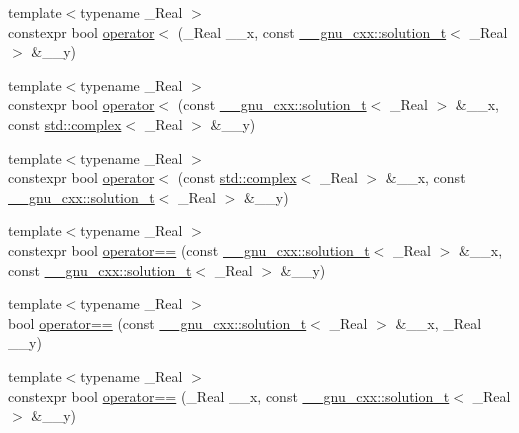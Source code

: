 \begin{DoxyCompactItemize}
\item 
{\footnotesize template$<$typename \+\_\+\+Real $>$ }\\constexpr bool \hyperlink{namespacestd_a183c95d9119b28c67d257989db658fdb}{operator$<$} (\+\_\+\+Real \+\_\+\+\_\+x, const \hyperlink{namespace____gnu__cxx_ae20ea642de50eb361074c62676b0159c}{\+\_\+\+\_\+gnu\+\_\+cxx\+::solution\+\_\+t}$<$ \+\_\+\+Real $>$ \&\+\_\+\+\_\+y)
\item 
{\footnotesize template$<$typename \+\_\+\+Real $>$ }\\constexpr bool \hyperlink{namespacestd_a4586465c3d71c8a977bb56c06c604eab}{operator$<$} (const \hyperlink{namespace____gnu__cxx_ae20ea642de50eb361074c62676b0159c}{\+\_\+\+\_\+gnu\+\_\+cxx\+::solution\+\_\+t}$<$ \+\_\+\+Real $>$ \&\+\_\+\+\_\+x, const \hyperlink{classstd_1_1complex}{std\+::complex}$<$ \+\_\+\+Real $>$ \&\+\_\+\+\_\+y)
\item 
{\footnotesize template$<$typename \+\_\+\+Real $>$ }\\constexpr bool \hyperlink{namespacestd_a907778dd7263e96c120e62cc0901dde9}{operator$<$} (const \hyperlink{classstd_1_1complex}{std\+::complex}$<$ \+\_\+\+Real $>$ \&\+\_\+\+\_\+x, const \hyperlink{namespace____gnu__cxx_ae20ea642de50eb361074c62676b0159c}{\+\_\+\+\_\+gnu\+\_\+cxx\+::solution\+\_\+t}$<$ \+\_\+\+Real $>$ \&\+\_\+\+\_\+y)
\item 
{\footnotesize template$<$typename \+\_\+\+Real $>$ }\\constexpr bool \hyperlink{namespacestd_aeae8446ca6e32925d681634d5db05780}{operator==} (const \hyperlink{namespace____gnu__cxx_ae20ea642de50eb361074c62676b0159c}{\+\_\+\+\_\+gnu\+\_\+cxx\+::solution\+\_\+t}$<$ \+\_\+\+Real $>$ \&\+\_\+\+\_\+x, const \hyperlink{namespace____gnu__cxx_ae20ea642de50eb361074c62676b0159c}{\+\_\+\+\_\+gnu\+\_\+cxx\+::solution\+\_\+t}$<$ \+\_\+\+Real $>$ \&\+\_\+\+\_\+y)
\item 
{\footnotesize template$<$typename \+\_\+\+Real $>$ }\\bool \hyperlink{namespacestd_a08af35ce00cff32a8b0a06b87d63f158}{operator==} (const \hyperlink{namespace____gnu__cxx_ae20ea642de50eb361074c62676b0159c}{\+\_\+\+\_\+gnu\+\_\+cxx\+::solution\+\_\+t}$<$ \+\_\+\+Real $>$ \&\+\_\+\+\_\+x, \+\_\+\+Real \+\_\+\+\_\+y)
\item 
{\footnotesize template$<$typename \+\_\+\+Real $>$ }\\constexpr bool \hyperlink{namespacestd_ae5dda4ad56d172c7d64f58b465e3c5c2}{operator==} (\+\_\+\+Real \+\_\+\+\_\+x, const \hyperlink{namespace____gnu__cxx_ae20ea642de50eb361074c62676b0159c}{\+\_\+\+\_\+gnu\+\_\+cxx\+::solution\+\_\+t}$<$ \+\_\+\+Real $>$ \&\+\_\+\+\_\+y)

\end{DoxyCompactItemize}
